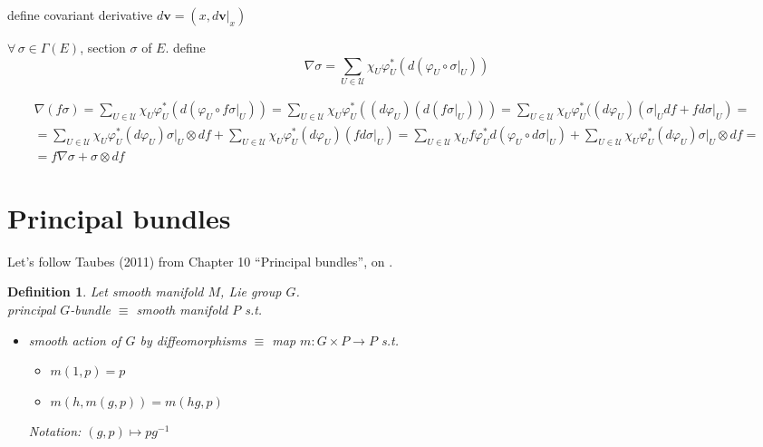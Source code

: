 \documentclass[10pt]{amsart}
\newtheorem{definition}{Definition}
\begin{document}
\begin{multicols*}{2}
define covariant derivative $d\mathbf{v} = (x,\left. d\mathbf{v}\right|_x)$

$\forall \, \sigma \in \Gamma(E)$, section $\sigma$ of $E$. define
\[
\nabla \sigma = \sum_{U \in \mathcal{U}} \chi_U \varphi_U^*(d(\varphi_U \circ \left. \sigma \right|_U ) )
\]

\[
\begin{gathered}
  \nabla (f\sigma) = \sum_{U \in \mathcal{U}} \chi_U \varphi_U^*(d(\varphi_U \circ f \left. \sigma \right|_U ) )  = \sum_{U \in \mathcal{U}} \chi_U \varphi_U^*((d\varphi_U) (d (f \left. \sigma \right|_U ) ) ) = \sum_{U \in \mathcal{U}} \chi_U \varphi_U^*((d\varphi_U) ( \left. \sigma \right|_U df + f \left. d\sigma \right|_U ) = \\
=  \sum_{U \in \mathcal{U}} \chi_U \varphi_U^*(d\varphi_U) \left. \sigma \right|_U \otimes df + \sum_{U \in \mathcal{U}} \chi_U \varphi_U^*(d\varphi_U)(f \left. d\sigma  \right|_U ) = \sum_{U \in \mathcal{U}} \chi_U f \varphi_U^* d ( \varphi_U \circ \left. d\sigma  \right|_U ) +  \sum_{U \in \mathcal{U}} \chi_U \varphi_U^*(d\varphi_U) \left. \sigma \right|_U \otimes df = \\
= f\nabla \sigma + \sigma \otimes df
\end{gathered}
\]

\section{Principal bundles}

Let's follow Taubes (2011) from Chapter 10 ``Principal bundles'', on \cite{CTaubes2011}.


\begin{definition}
  Let smooth manifold $M$, Lie group $G$. \\
  \emph{principal} $G$-bundle $\equiv $ smooth manifold $P$ s.t. 
\begin{itemize}
  \item smooth action of $G$ by diffeomorphisms $\equiv$ map $m: G \times P \to P$ s.t. 
    \begin{itemize}
      \item $m(1,p) =p$
      \item $m(h,m(g,p)) = m(hg,p)$
    \end{itemize}
    Notation: $(g,p) \mapsto pg^{-1}$


\end{itemize}
\end{definition}
\end{multicols*}
\end{document}
